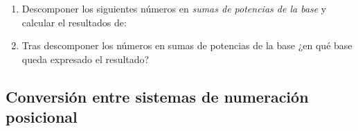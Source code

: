 \documentclass[12pt]{article}
\begin{document}
\begin{enumerate}

    \item Descomponer los siguientes números en \emph{sumas de potencias de la
        base} y calcular el resultados de:


    \item Tras descomponer los números en sumas de potencias de la base ¿en
        qué base queda expresado el resultado?

\end{enumerate}

\subsection{Conversión entre sistemas de numeración posicional}
\end{document}
